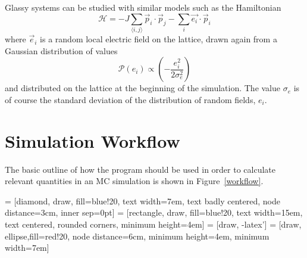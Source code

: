 \documentclass[aps,prb,twocolumn,showpacs,superscriptaddress,floatfix]{revtex4-1}
\begin{document}
Glassy systems can be studied with similar models such as the Hamiltonian
\begin{equation}
\mathcal{H} = -J\sum_{\langle i,j\rangle} \vec{p}_i \cdot \vec{p}_j - \sum_i\vec{e_i}\cdot\vec{p}_i
\end{equation}
where $\vec{e}_i$ is a random local electric field on the lattice, drawn again from a Gaussian distribution of values 
\begin{equation}
\mathcal{P}(e_i) \propto \left( -\frac{e_{i}^2}{2\sigma_{e}^2} \right)
\end{equation}
and distributed on the lattice at the beginning of the simulation. The value $\sigma_{e}$ is of course the standard deviation of the distribution of random fields, $e_i$. 
\section{Simulation Workflow}
The basic outline of how the program should be used in order to calculate relevant quantities in an MC simulation is shown in Figure~\ref{workflow}.

 = [diamond, draw, fill=blue!20, 
    text width=7em, text badly centered, node distance=3cm, inner sep=0pt]
 = [rectangle, draw, fill=blue!20, 
    text width=15em, text centered, rounded corners, minimum height=4em]
 = [draw, -latex']
 = [draw, ellipse,fill=red!20, node distance=6cm,
    minimum height=4em, minimum width=7em]
    
\end{document}
